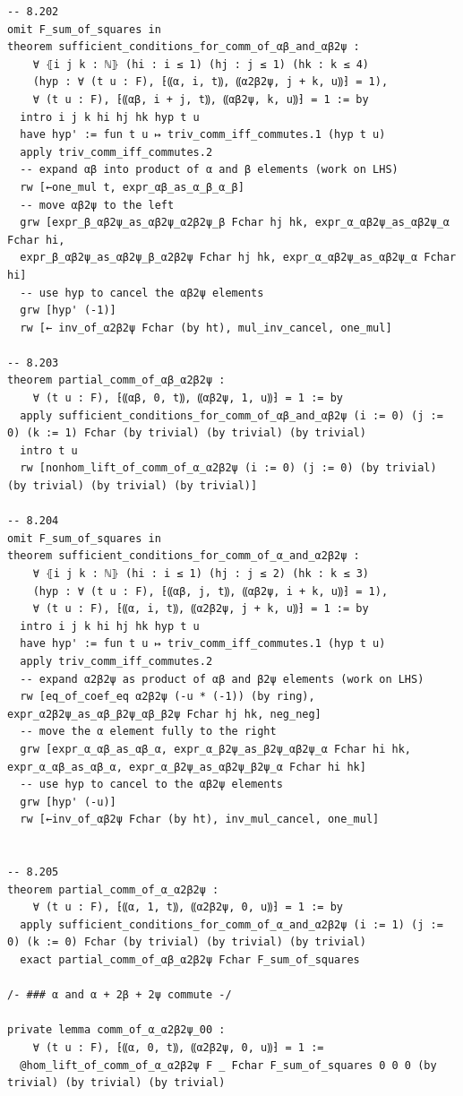 \begin{Verbatim}
-- 8.202
omit F_sum_of_squares in
theorem sufficient_conditions_for_comm_of_αβ_and_αβ2ψ :
    ∀ ⦃i j k : ℕ⦄ (hi : i ≤ 1) (hj : j ≤ 1) (hk : k ≤ 4)
    (hyp : ∀ (t u : F), ⁅⸨α, i, t⸩, ⸨α2β2ψ, j + k, u⸩⁆ = 1),
    ∀ (t u : F), ⁅⸨αβ, i + j, t⸩, ⸨αβ2ψ, k, u⸩⁆ = 1 := by
  intro i j k hi hj hk hyp t u
  have hyp' := fun t u ↦ triv_comm_iff_commutes.1 (hyp t u)
  apply triv_comm_iff_commutes.2
  -- expand αβ into product of α and β elements (work on LHS)
  rw [←one_mul t, expr_αβ_as_α_β_α_β]
  -- move αβ2ψ to the left
  grw [expr_β_αβ2ψ_as_αβ2ψ_α2β2ψ_β Fchar hj hk, expr_α_αβ2ψ_as_αβ2ψ_α Fchar hi,
  expr_β_αβ2ψ_as_αβ2ψ_β_α2β2ψ Fchar hj hk, expr_α_αβ2ψ_as_αβ2ψ_α Fchar hi]
  -- use hyp to cancel the αβ2ψ elements
  grw [hyp' (-1)]
  rw [← inv_of_α2β2ψ Fchar (by ht), mul_inv_cancel, one_mul]

-- 8.203
theorem partial_comm_of_αβ_α2β2ψ :
    ∀ (t u : F), ⁅⸨αβ, 0, t⸩, ⸨αβ2ψ, 1, u⸩⁆ = 1 := by
  apply sufficient_conditions_for_comm_of_αβ_and_αβ2ψ (i := 0) (j := 0) (k := 1) Fchar (by trivial) (by trivial) (by trivial)
  intro t u
  rw [nonhom_lift_of_comm_of_α_α2β2ψ (i := 0) (j := 0) (by trivial) (by trivial) (by trivial) (by trivial)]

-- 8.204
omit F_sum_of_squares in
theorem sufficient_conditions_for_comm_of_α_and_α2β2ψ :
    ∀ ⦃i j k : ℕ⦄ (hi : i ≤ 1) (hj : j ≤ 2) (hk : k ≤ 3)
    (hyp : ∀ (t u : F), ⁅⸨αβ, j, t⸩, ⸨αβ2ψ, i + k, u⸩⁆ = 1),
    ∀ (t u : F), ⁅⸨α, i, t⸩, ⸨α2β2ψ, j + k, u⸩⁆ = 1 := by
  intro i j k hi hj hk hyp t u
  have hyp' := fun t u ↦ triv_comm_iff_commutes.1 (hyp t u)
  apply triv_comm_iff_commutes.2
  -- expand α2β2ψ as product of αβ and β2ψ elements (work on LHS)
  rw [eq_of_coef_eq α2β2ψ (-u * (-1)) (by ring), expr_α2β2ψ_as_αβ_β2ψ_αβ_β2ψ Fchar hj hk, neg_neg]
  -- move the α element fully to the right
  grw [expr_α_αβ_as_αβ_α, expr_α_β2ψ_as_β2ψ_αβ2ψ_α Fchar hi hk, expr_α_αβ_as_αβ_α, expr_α_β2ψ_as_αβ2ψ_β2ψ_α Fchar hi hk]
  -- use hyp to cancel to the αβ2ψ elements
  grw [hyp' (-u)]
  rw [←inv_of_αβ2ψ Fchar (by ht), inv_mul_cancel, one_mul]


-- 8.205
theorem partial_comm_of_α_α2β2ψ :
    ∀ (t u : F), ⁅⸨α, 1, t⸩, ⸨α2β2ψ, 0, u⸩⁆ = 1 := by
  apply sufficient_conditions_for_comm_of_α_and_α2β2ψ (i := 1) (j := 0) (k := 0) Fchar (by trivial) (by trivial) (by trivial)
  exact partial_comm_of_αβ_α2β2ψ Fchar F_sum_of_squares

/- ### α and α + 2β + 2ψ commute -/

private lemma comm_of_α_α2β2ψ_00 :
    ∀ (t u : F), ⁅⸨α, 0, t⸩, ⸨α2β2ψ, 0, u⸩⁆ = 1 :=
  @hom_lift_of_comm_of_α_α2β2ψ F _ Fchar F_sum_of_squares 0 0 0 (by trivial) (by trivial) (by trivial)


\end{Verbatim}
